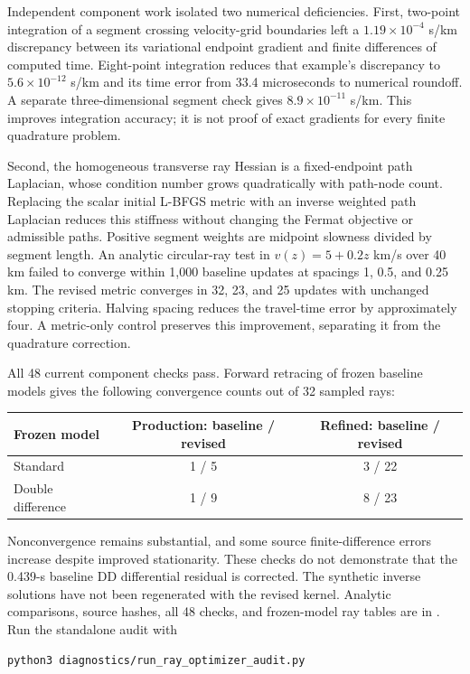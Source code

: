 \documentclass[11pt]{article}
\begin{document}
Independent component work isolated two numerical deficiencies. First,
two-point integration of a segment crossing velocity-grid boundaries left
a $1.19\times10^{-4}$ s/km discrepancy between its variational endpoint
gradient and finite differences of computed time. Eight-point integration
reduces that example's discrepancy to $5.6\times10^{-12}$ s/km and its
time error from 33.4 microseconds to numerical roundoff. A separate
three-dimensional segment check gives $8.9\times10^{-11}$ s/km.
This improves integration accuracy; it is not proof of exact gradients for
every finite quadrature problem.

Second, the homogeneous transverse ray Hessian is a fixed-endpoint path
Laplacian, whose condition number grows quadratically with path-node count.
Replacing the scalar initial L-BFGS metric with an inverse weighted path
Laplacian reduces this stiffness without changing the Fermat objective or
admissible paths. Positive segment weights are midpoint slowness divided by
segment length. An analytic circular-ray test in $v(z)=5+0.2z$ km/s over
40 km failed to converge within 1,000 baseline updates at spacings 1, 0.5,
and 0.25 km. The revised metric converges in 32, 23, and 25 updates with
unchanged stopping criteria. Halving spacing reduces the travel-time error
by approximately four. A metric-only control preserves this improvement,
separating it from the quadrature correction.

All 48 current component checks pass. Forward retracing of frozen baseline
models gives the following convergence counts out of 32 sampled rays:
\begin{center}
\begin{tabular}{lcc}
\toprule
Frozen model & Production: baseline / revised & Refined: baseline / revised\\
\midrule
Standard & 1 / 5 & 3 / 22\\
Double difference & 1 / 9 & 8 / 23\\
\bottomrule
\end{tabular}
\end{center}
Nonconvergence remains substantial, and some source finite-difference errors
increase despite improved stationarity. These checks do not demonstrate that
the 0.439-s baseline DD differential residual is corrected. The synthetic
inverse solutions have not been regenerated with the revised kernel. Analytic
comparisons, source hashes, all 48 checks, and frozen-model ray tables are in
. Run the standalone audit with
\begin{lstlisting}
python3 diagnostics/run_ray_optimizer_audit.py
\end{lstlisting}
\end{document}
